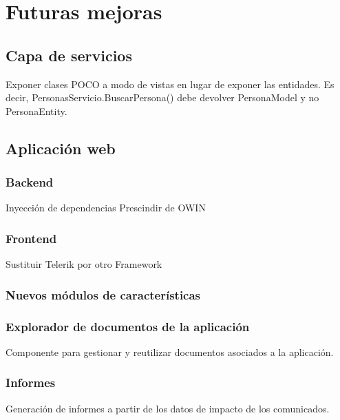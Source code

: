 \chapter{Futuras mejoras}

\section{Capa de servicios}
Exponer clases POCO a modo de vistas en lugar de exponer las entidades. Es decir, PersonasServicio.BuscarPersona() debe devolver PersonaModel y no PersonaEntity.

\section{Aplicación web}

\subsection{Backend}
Inyección de dependencias
Prescindir de OWIN

\subsection{Frontend}
Sustituir Telerik por otro Framework

\subsection{Nuevos módulos de características}

\subsection{Explorador de documentos de la aplicación}
Componente para gestionar y reutilizar documentos asociados a la aplicación.

\subsection{Informes}
Generación de informes a partir de los datos de impacto de los comunicados.